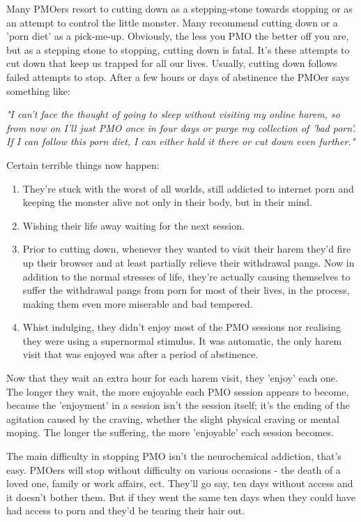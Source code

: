 \documentclass[easypeasy.tex]{subfiles}
\begin{document}
Many PMOers resort to cutting down as a stepping-stone towards stopping or as an attempt to control the little monster. Many recommend cutting down or a 'porn diet' as a pick-me-up. Obviously, the less you PMO the better off you are, but as a stepping stone to stopping, cutting down is fatal. It's these attempts to cut down that keep us trapped for all our lives. Usually, cutting down follows failed attempts to stop. After a few hours or days of abstinence the PMOer says something like:

  \textit{"I can't face the thought of going to sleep without visiting my online harem, so from now on I'll just PMO once in four days or purge my collection of 'bad porn'. If I can follow this porn diet, I can either hold it there or cut down even further."}

  Certain terrible things now happen:

 \begin{enumerate} 
  \item They're stuck with the worst of all worlds, still addicted to internet porn and keeping the monster alive not only in their body, but in their mind.

  \item Wishing their life away waiting for the next session.

  \item Prior to cutting down, whenever they wanted to visit their harem they'd fire up their browser and at least partially relieve their withdrawal pangs. Now in addition to the normal stresses of life, they're actually causing themselves to suffer the withdrawal pangs from porn for most of their lives, in the process, making them even more miserable and bad tempered.

  \item Whist indulging, they didn't enjoy most of the PMO sessions nor realising they were using a supernormal stimulus. It was automatic, the only harem visit that was enjoyed was after a period of abstinence.

\end{enumerate}
Now that they wait an extra hour for each harem visit, they 'enjoy' each one. The longer they wait, the more enjoyable each PMO session appears to become, because the 'enjoyment' in a session isn't the session itself; it's the ending of the agitation caused by the craving, whether the slight physical craving or mental moping. The longer the suffering, the more 'enjoyable' each session becomes.

The main difficulty in stopping PMO isn't the neurochemical addiction, that's easy. PMOers will stop without difficulty on various occasions - the death of a loved one, family or work affairs, ect. They'll go say, ten days without access and it doesn't bother them. But if they went the same ten days when they could have had access to porn and they'd be tearing their hair out.
\end{document}
